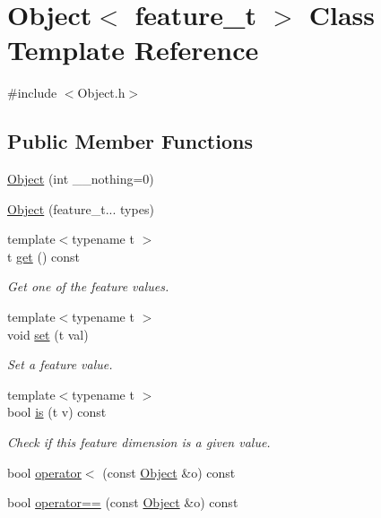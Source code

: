 \hypertarget{struct_object}{}\section{Object$<$ feature\+\_\+t $>$ Class Template Reference}
\label{struct_object}


{\ttfamily \#include $<$Object.\+h$>$}

\subsection*{Public Member Functions}
\begin{DoxyCompactItemize}
\item 
\hyperlink{struct_object_a98d515d0ebefa2a49ea148d3d2b0de72}{Object} (int \+\_\+\+\_\+nothing=0)
\item 
\hyperlink{struct_object_a41263b3773ab834bce3237371e69f429}{Object} (feature\+\_\+t... types)
\item 
{\footnotesize template$<$typename t $>$ }\\t \hyperlink{struct_object_a380e8d879bd922eedbf3c6aabcd64a61}{get} () const
\begin{DoxyCompactList}\small\item\em Get one of the feature values. \end{DoxyCompactList}\item 
{\footnotesize template$<$typename t $>$ }\\void \hyperlink{struct_object_a520a6392c6c1acf0a0a53a08b8ffaa7d}{set} (t val)
\begin{DoxyCompactList}\small\item\em Set a feature value. \end{DoxyCompactList}\item 
{\footnotesize template$<$typename t $>$ }\\bool \hyperlink{struct_object_a7ced49ee95a75ef440d3c2934c6485e0}{is} (t v) const
\begin{DoxyCompactList}\small\item\em Check if this feature dimension is a given value. \end{DoxyCompactList}\item 
bool \hyperlink{struct_object_a0475b6347042bc03cf1cb023fc6c36b3}{operator$<$} (const \hyperlink{struct_object}{Object} \&o) const
\item 
bool \hyperlink{struct_object_a39a1f236eb1afac749bf956124dab79d}{operator==} (const \hyperlink{struct_object}{Object} \&o) const
\end{DoxyCompactItemize}
